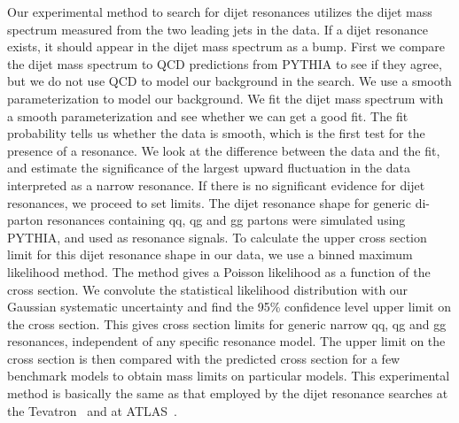 Our experimental method to search for dijet resonances utilizes the
dijet mass spectrum measured from the two leading jets in the data.
If a dijet resonance exists, it should appear in the dijet mass
spectrum as a bump. First we compare the dijet mass spectrum to QCD
predictions from PYTHIA to see if they agree, but we do not use QCD to
model our background in the search.  We use a smooth parameterization
to model our background. We fit the dijet mass spectrum with a smooth
parameterization and see whether we can get a good fit.  The fit
probability tells us whether the data is smooth, which is the first
test for the presence of a resonance.  We look at the difference
between the data and the fit, and estimate the significance of the
largest upward fluctuation in the data interpreted as a narrow
resonance.  If there is no significant evidence for dijet resonances,
we proceed to set limits. The dijet resonance shape for generic
di-parton resonances containing qq, qg and gg partons were simulated
using PYTHIA, and used as resonance signals. To calculate the upper
cross section limit for this dijet resonance shape in our data, we use
a binned maximum likelihood method. The method gives a Poisson
likelihood as a function of the cross section.  We convolute the
statistical likelihood distribution with our Gaussian systematic
uncertainty and find the 95\% confidence level upper limit on the
cross section. This gives cross section limits for generic narrow qq,
qg and gg resonances, independent of any specific resonance model.
The upper limit on the cross section is then compared with the
predicted cross section for a few benchmark models to obtain mass
limits on particular models. This experimental method is basically the
same as that employed by the dijet resonance searches at the
Tevatron~\cite{Aaltonen:2008dn,Abazov:2003tj,Abe:1997hm} and at
ATLAS~\cite{ATLAS_Search}.
